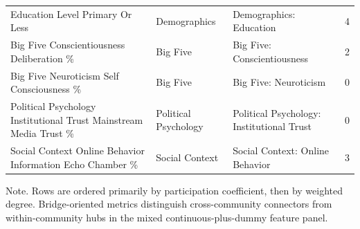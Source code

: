 \begin{table}[htbp]
\begin{threeparttable}
\begin{tabular}{lllr}
Education Level Primary Or Less & Demographics & Demographics: Education & 4 \\
Big Five Conscientiousness Deliberation \% & Big Five & Big Five: Conscientiousness & 2 \\
Big Five Neuroticism Self Consciousness \% & Big Five & Big Five: Neuroticism & 0 \\
Political Psychology Institutional Trust Mainstream Media Trust \% & Political Psychology & Political Psychology: Institutional Trust & 0 \\
Social Context Online Behavior Information Echo Chamber \% & Social Context & Social Context: Online Behavior & 3 \\
\bottomrule
\end{tabular}
\begin{tablenotes}[flushleft]
\footnotesize
\item Note. Rows are ordered primarily by participation coefficient, then by weighted degree. Bridge-oriented metrics distinguish cross-community connectors from within-community hubs in the mixed continuous-plus-dummy feature panel.
\end{tablenotes}
\end{threeparttable}
\end{table}